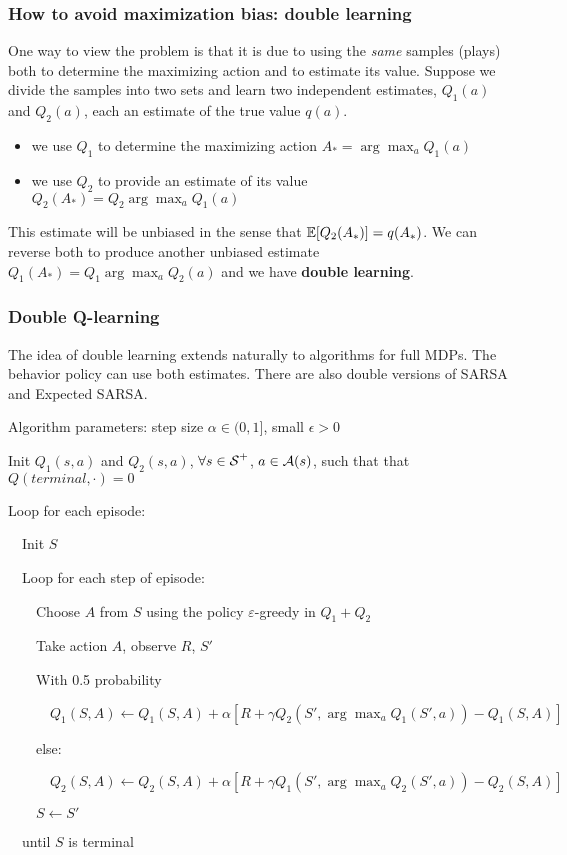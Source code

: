 \documentclass[sutton_barto_notes.tex]{subfiles}
\begin{document}
\subsubsection{How to avoid maximization bias: double learning}

One way to view the problem is that it is due to using the \textit{same} samples (plays) both to determine the maximizing action and to estimate its value.
Suppose we divide the samples into two sets and learn two independent estimates, $Q_1(a)$ and $Q_2(a)$, each an estimate of the true value $q(a)$.
\begin{itemize}
\item we use $Q_1$ to determine the maximizing action $A_* = \arg\max_a Q_1(a)$
\item we use $Q_2$ to provide an estimate of its value $Q_2(A_*) = Q_2 \arg\max_a Q_1(a)$
\end{itemize}
This estimate will be unbiased in the sense that $\operatorname*{\mathbb{E}} [Q_2(A_*)] = q(A_*)$. We can reverse both to produce another unbiased estimate $Q_1(A_*) = Q_1 \arg\max_a Q_2(a)$ and we have \textbf{double learning}.

\subsubsection{Double Q-learning}

The idea of double learning extends naturally to algorithms for full MDPs. The behavior policy can use both estimates. There are also double versions of SARSA and Expected SARSA.

\begin{tcolorbox}[width=1.1\textwidth,title={Double Q-learning for estimating $Q_1 \approx Q_2 \approx q_*$}]
Algorithm parameters: step size $\alpha \in (0,1]$, small $\epsilon > 0$

Init $Q_1(s,a)$ and $Q_2(s,a)$, $\forall s \in {\operatorname*{\mathcal{S}}}^+$, $a \in \operatorname*{\mathcal{A}}(s)$, such that that $Q(terminal,\cdot)=0$

Loop for each episode:

$\quad$Init $S$

$\quad$Loop for each step of episode:

$\quad\quad$Choose $A$ from $S$ using the policy $\varepsilon$-greedy in $Q_1 + Q_2$

$\quad\quad$Take action $A$, observe $R$, $S'$

$\quad\quad$With 0.5 probability

$\quad\quad\quad Q_1(S, A) \leftarrow Q_1(S, A) + \alpha [ R + \gamma Q_2( S', \arg\max_a Q_1(S',a) ) - Q_1(S, A)]$

$\quad\quad$else:

$\quad\quad\quad Q_2(S, A) \leftarrow Q_2(S, A) + \alpha [ R + \gamma Q_1( S', \arg\max_a Q_2(S',a) ) - Q_2(S, A)]$

$\quad\quad S \leftarrow S'$

$\quad$until $S$ is terminal
\end{tcolorbox}
\end{document}
